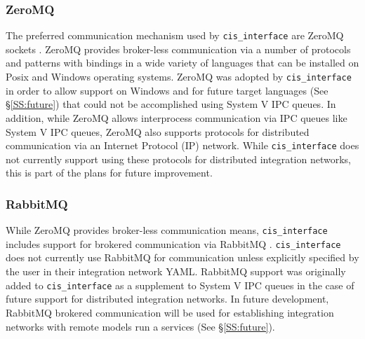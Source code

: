 \documentclass[journal]{IEEEtran}
\newcommand{\cis}{{\tt cis\_interface}{}}
\begin{document}
\subsubsection{ZeroMQ}\label{SSS:zmq}
%
The preferred communication mechanism used by {\cis} are ZeroMQ sockets 
\citep{Akgul2013}. ZeroMQ 
provides broker-less communication via a number of protocols and patterns with 
bindings in a wide variety of languages that can be installed on Posix and Windows 
operating systems. ZeroMQ was adopted by {\cis} in order to allow support 
on Windows and for future target languages (See \S\ref{SS:future}) that could not be 
accomplished using System V IPC queues. In addition, while ZeroMQ allows 
interprocess communication via IPC queues like System V IPC queues, ZeroMQ also 
supports protocols for distributed communication via an Internet Protocol (IP) 
network. While {\cis} does not currently support using these protocols 
for distributed integration networks, this is part of the plans for future improvement.

\subsubsection{RabbitMQ}\label{SSS:rmq}
%
While ZeroMQ provides broker-less communication means, {\cis} includes support 
for brokered communication via RabbitMQ \citep{RMQ}. {\cis} does not currently use 
RabbitMQ for communication unless explicitly specified by the user in their 
integration network YAML. RabbitMQ support was originally added to {\cis} 
as a supplement to System V IPC queues in the case of future support for distributed 
integration networks. In future development, RabbitMQ brokered communication will be 
used for establishing integration networks with remote models run a services 
(See \S\ref{SS:future}).

\end{document}
